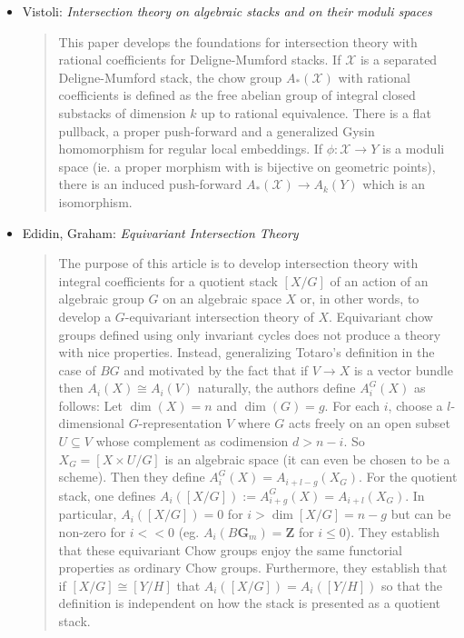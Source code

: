 \begin{itemize}
\item
Vistoli: \emph{Intersection theory on algebraic stacks and on their moduli
spaces} \cite{vistoli_intersection}
\begin{quote}
This paper develops the foundations for intersection theory with rational
coefficients for Deligne-Mumford stacks. If $\mathcal{X}$ is a separated
Deligne-Mumford stack, the chow group $A_*(\mathcal{X})$ with rational
coefficients is
defined as the free abelian group of integral closed substacks of dimension $k$
up to rational equivalence. There is a flat pullback, a proper push-forward
and a generalized Gysin homomorphism for regular local embeddings. If $\phi:
\mathcal{X} \to Y$ is a moduli space (ie. a proper morphism with is bijective
on
geometric points), there is an induced push-forward $A_*(\mathcal{X}) \to
A_k(Y)$
which is an isomorphism.
\end{quote}
\item Edidin, Graham: \emph{Equivariant Intersection Theory}
\cite{edidin-graham}
\begin{quote}
The purpose of this article is to develop intersection theory with integral
coefficients for a quotient stack $[X/G]$ of an action of an algebraic group
$G$ on an algebraic space $X$ or, in other words, to develop a $G$-equivariant
intersection theory of $X$. Equivariant chow groups defined using only
invariant cycles does not produce a theory with nice properties. Instead,
generalizing Totaro's definition in the case of $BG$ and motivated by the fact
that if $V \to X$ is a vector bundle then $A_i(X) \cong A_i(V)$ naturally, the
authors define $A_i^G(X)$ as follows:
Let $\dim(X) = n$ and $\dim(G) = g$. For each $i$, choose a $l$-dimensional
$G$-representation $V$ where $G$ acts freely on an open subset $U \subseteq V$
whose complement as codimension $d > n-i$. So $X_G= [X \times U / G]$ is an
algebraic space (it can even be chosen to be a scheme). Then they define
$A_i^G(X) = A_{i+l-g}(X_G)$. For the quotient stack, one defines $A_i( [X/G])
:= A_{i+g}^G(X) = A_{i+l}(X_G)$. In particular, $A_i([X/G]) = 0$ for $i > \dim
[X/G] = n - g$ but can be non-zero for $i << 0$ (eg. $A_i(B \mathbf{G}_m) =
\mathbf{Z}$ for
$i \le 0$).
They establish that these equivariant Chow groups enjoy the same functorial
properties as ordinary Chow groups. Furthermore, they establish that if $[X /
G] \cong [Y / H]$ that $A_i([X/G]) = A_i([Y/H])$ so that the definition is
independent on how the stack is presented as a quotient stack.
\end{quote}

\end{itemize}
